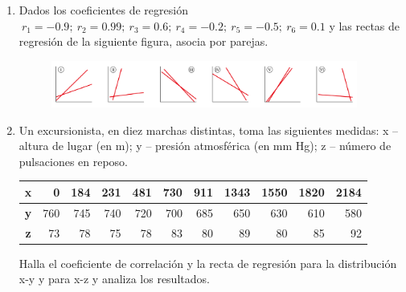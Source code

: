 \begin{adjustwidth}{20pt}{10pt}
\begin{enumerate}[PB. 1. ]
\hspace{-1cm}\vspace{1cm}





\item Dados los coeficientes de regresión $\ r_1=-0.9;\ r_2=0.99;\ r_3=0.6;\ r_4=-0.2;\ r_5=-0.5; \ r_6=0.1$ y las rectas de regresión de la siguiente figura, asocia por parejas.

\begin{figure}[H]
			\centering
			\includegraphics[width=0.95\textwidth]{imagenes/imagenes03/T03IM20.png}
	\end{figure}

 
\hspace{-1cm}\vspace{1cm}





\item Un excursionista, en diez marchas distintas, toma las siguientes medidas: x -- altura de lugar (en m); y -- presión atmosférica (en mm Hg); z -- número de pulsaciones en reposo.

\begin{table}[H]
\centering
\begin{tabular}{|c|r|r|r|r|r|r|r|r|r|r|}
\hline
\textbf{x} & 0 & 184 & 231 & 481 & 730 & 911 & 1343 & 1550 & 1820 & 2184 \\ \hline
\textbf{y} & 760 & 745 & 740 & 720 & 700 & 685 & 650 & 630 & 610 & 580 \\ \hline
\textbf{z} & 73 & 78 & 75 & 78 & 83 & 80 & 89 & 80 & 85 & 92 \\ \hline
\end{tabular}
\end{table}

Halla el coeficiente de correlación y la recta de regresión para la distribución x-y y para x-z y analiza los resultados.
 
\hspace{-1cm}\vspace{1cm}





\end{enumerate}
\end{adjustwidth}
